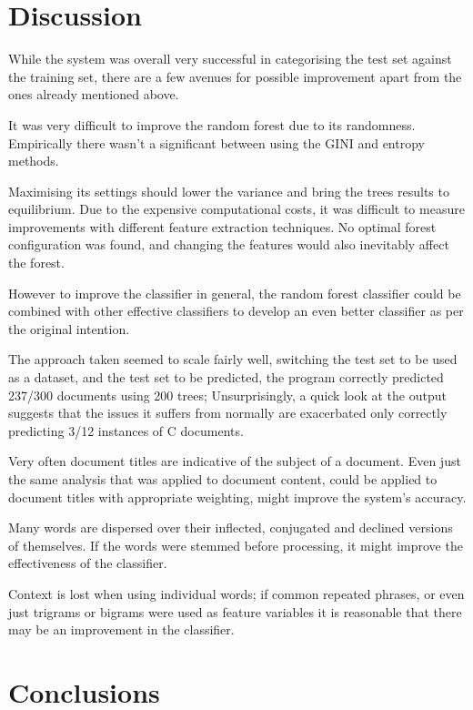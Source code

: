 \documentclass[11pt]{article}
\begin{document}
\section{Discussion}

While the system was overall very successful in categorising the test set
against the training set, there are a few avenues for possible improvement apart
from the ones already mentioned above.

It was very difficult to improve the random forest due to its randomness.
Empirically there wasn't a significant between using the GINI and entropy
methods. 

Maximising its settings should lower the variance and bring the trees results to
equilibrium. Due to the expensive computational costs, it was difficult to
measure improvements with different feature extraction techniques. No optimal
forest configuration was found, and changing the features would also inevitably
affect the forest. 

However to improve the classifier in general, the random forest classifier could
be combined with other effective classifiers to develop an even better
classifier as per the original intention.

The approach taken seemed to scale fairly well, switching the test set to be
used as a dataset, and the test set to be predicted, the program correctly
predicted 237/300 documents using 200 trees; Unsurprisingly, a quick look at the
output suggests that the issues it suffers from normally are exacerbated only
correctly predicting 3/12 instances of C documents.

Very often document titles are indicative of the subject of a document. Even
just the same analysis that was applied to document content, could be applied
to document titles with appropriate weighting, might improve the system's
accuracy.

Many words are dispersed over their inflected, conjugated and declined
versions of themselves. If the words were stemmed before processing, it might
improve the effectiveness of the classifier.

Context is lost when using individual words; if common repeated phrases, or even
just trigrams or bigrams were used as feature variables it is reasonable that
there may be an improvement in the classifier.

\section{Conclusions}
\end{document}
